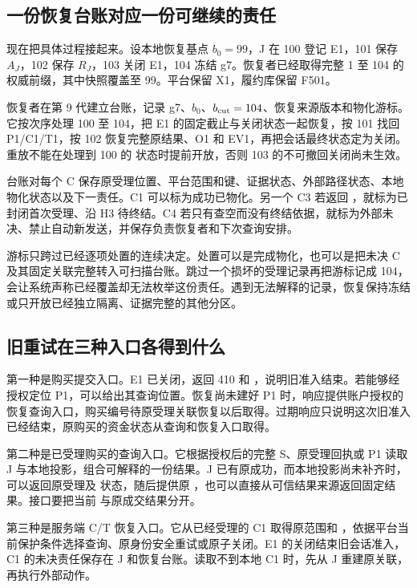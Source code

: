 \subsection*{一份恢复台账对应一份可继续的责任}

现在把具体过程接起来。设本地恢复基点 $b_0=99$，J 在 100 登记 E1，101 保存 $A_J$，102 保存 $R_J$，103 关闭 E1，104 冻结 g7。恢复者已经取得完整 1 至 104 的权威前缀，其中快照覆盖至 99。平台保留 X1，履约库保留 F501。

恢复者在第 9 代建立台账，记录 g7、$b_0$、$b_{\rm cut}=104$、恢复来源版本和物化游标。它按次序处理 100 至 104，把 E1 的固定截止与关闭状态一起恢复，按 101 找回 P1/C1/T1，按 102 恢复完整原结果、O1 和 EV1，再把会话最终状态定为关闭。重放不能在处理到 100 的  状态时提前开放，否则 103 的不可撤回关闭尚未生效。


台账对每个 C 保存原受理位置、平台范围和键、证据状态、外部路径状态、本地物化状态以及下一责任。C1 可以标为成功已物化。另一个 C3 若返回 ，就标为已封闭首次受理、沿 H3 待终结。C4 若只有查空而没有终结依据，就标为外部未决、禁止自动新发送，并保存负责恢复者和下次查询安排。

游标只跨过已经逐项处置的连续决定。处置可以是完成物化，也可以是把未决 C 及其固定关联完整转入可扫描台账。跳过一个损坏的受理记录再把游标记成 104，会让系统声称已经覆盖却无法枚举这份责任。遇到无法解释的记录，恢复保持冻结或只开放已经独立隔离、证据完整的其他分区。

\subsection*{旧重试在三种入口各得到什么}

第一种是购买提交入口。E1 已关闭，返回 410 和 ，说明旧准入结束。若能够经授权定位 P1，可以给出其查询位置。恢复尚未建好 P1 时，响应提供账户授权的恢复查询入口，购买编号待原受理关联恢复以后取得。过期响应只说明这次旧准入已经结束，原购买的资金状态从查询和恢复入口取得。

第二种是已受理购买的查询入口。它根据授权后的完整 S、原受理回执或 P1 读取 J 与本地投影，组合可解释的一份结果。J 已有原成功，而本地投影尚未补齐时，可以返回原受理及  状态，随后提供原 ，也可以直接从可信结果来源返回固定结果。接口要把当前  与原成交结果分开。

第三种是服务端 C/T 恢复入口。它从已经受理的 C1 取得原范围和 ，依据平台当前保护条件选择查询、原身份安全重试或原子关闭。E1 的关闭结束旧会话准入，C1 的未决责任保存在 J 和恢复台账。读取不到本地 C1 时，先从 J 重建原关联，再执行外部动作。

